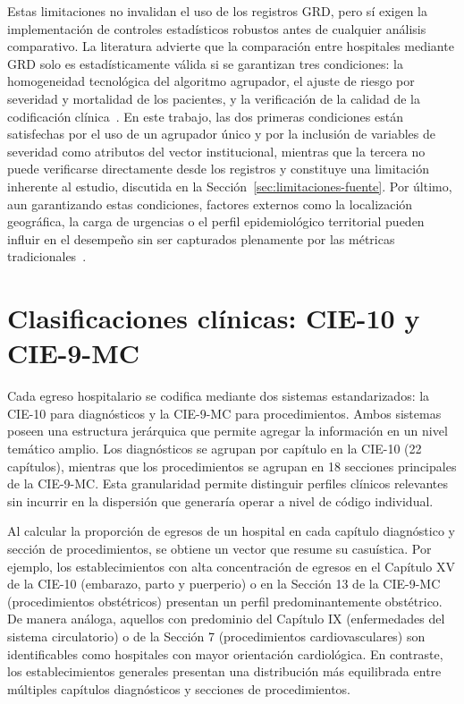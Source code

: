 Estas limitaciones no invalidan el uso de los registros GRD, pero sí exigen la
implementación de controles estadísticos robustos antes de cualquier análisis
comparativo. La literatura advierte que la comparación entre hospitales mediante
GRD solo es estadísticamente válida si se garantizan tres condiciones: la
homogeneidad tecnológica del algoritmo agrupador, el ajuste de riesgo por
severidad y mortalidad de los pacientes, y la verificación de la calidad de la
codificación clínica~\citep{Aguila2019}. En este trabajo, las dos primeras
condiciones están satisfechas por el uso de un agrupador único y por la inclusión
de variables de severidad como atributos del vector institucional, mientras que la tercera no
puede verificarse directamente desde los registros y constituye una limitación
inherente al estudio, discutida en la Sección~\ref{sec:limitaciones-fuente}.
Por último, aun garantizando estas condiciones, factores externos como la localización
geográfica, la carga de urgencias o el perfil epidemiológico territorial pueden
influir en el desempeño sin ser capturados plenamente por las métricas
tradicionales~\citep{Havranek2023}.


\section{Clasificaciones clínicas: CIE-10 y CIE-9-MC}
\label{sec:cie}

Cada egreso hospitalario se codifica mediante dos sistemas estandarizados: la
CIE-10 para diagnósticos y la CIE-9-MC para procedimientos. Ambos sistemas
poseen una estructura jerárquica que permite agregar la información en un nivel
temático amplio. Los diagnósticos se agrupan por capítulo en la CIE-10
(22 capítulos), mientras que los procedimientos se agrupan en 18 secciones
principales de la CIE-9-MC. Esta granularidad permite distinguir perfiles
clínicos relevantes sin incurrir en la dispersión que generaría operar a nivel
de código individual.

Al calcular la proporción de egresos de un hospital en cada capítulo diagnóstico
y sección de procedimientos, se obtiene un vector que resume su casuística. Por
ejemplo, los establecimientos con alta concentración de egresos en el
Capítulo XV de la CIE-10 (embarazo, parto y puerperio) o en la Sección 13 de la
CIE-9-MC (procedimientos obstétricos) presentan un perfil predominantemente
obstétrico. De manera análoga, aquellos con predominio del Capítulo IX
(enfermedades del sistema circulatorio) o de la Sección 7 (procedimientos
cardiovasculares) son identificables como hospitales con mayor orientación
cardiológica. En contraste, los establecimientos generales presentan una
distribución más equilibrada entre múltiples capítulos diagnósticos y secciones
de procedimientos.

